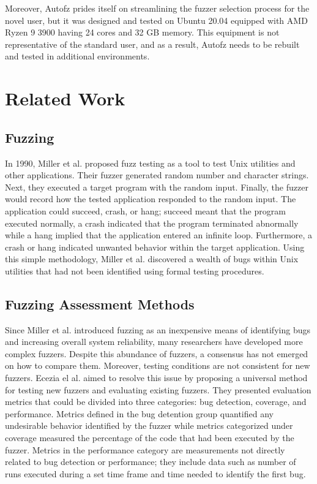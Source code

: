 Moreover, Autofz prides itself on streamlining the fuzzer selection process for 
the novel user, but it was designed and tested on Ubuntu 20.04 equipped with AMD 
Ryzen 9 3900 having 24 cores and 32 GB memory. This equipment is not representative 
of the standard user, and as a result, Autofz needs to be rebuilt and tested in 
additional environments. \cite{Fu}

\section{Related Work}

\subsection{Fuzzing}
In 1990, Miller et al. proposed fuzz testing as a tool to test Unix utilities 
and other applications. Their fuzzer generated random number and character 
strings. Next, they executed a target program with the random input. Finally, 
the fuzzer would record how the tested application responded to the random input. 
The application could succeed, crash, or hang; succeed meant that the program 
executed normally, a crash indicated that the program terminated abnormally while 
a hang implied that the application entered an infinite loop. Furthermore, a 
crash or hang indicated unwanted behavior within the target application. Using this 
simple methodology, Miller et al. discovered a wealth of bugs within Unix utilities 
that had not been identified using formal testing procedures. \cite{Miller}

\subsection{Fuzzing Assessment Methods}
Since Miller et al. introduced fuzzing as an inexpensive means of identifying bugs 
and increasing overall system reliability, many researchers have developed more 
complex fuzzers. Despite this abundance of fuzzers, a consensus has not emerged 
on how to compare them. Moreover, testing conditions are not consistent for new fuzzers. 
Ecezia el al. aimed to resolve this issue by proposing a universal method for testing new 
fuzzers and evaluating existing fuzzers. They presented evaluation metrics that could be 
divided into three categories: bug detection, coverage, and performance. Metrics defined 
in the bug detention group quantified any undesirable behavior identified by the fuzzer 
while metrics categorized under coverage measured the percentage of the code that had 
been executed by the fuzzer. Metrics in the performance category are measurements not 
directly related to bug detection or performance; they include data such as number of 
runs executed during a set time frame and time needed to identify the first bug.


